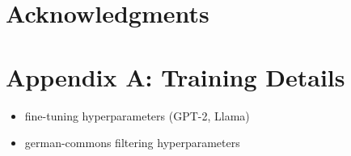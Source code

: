 \documentclass[10pt,letterpaper]{article}
\begin{document}
\section{Acknowledgments}


\printbibliography

\appendix

\section{Appendix A: Training Details}

\begin{itemize}
  \item fine-tuning hyperparameters (GPT-2, Llama)
  \item german-commons filtering hyperparameters
\end{itemize}
\end{document}
